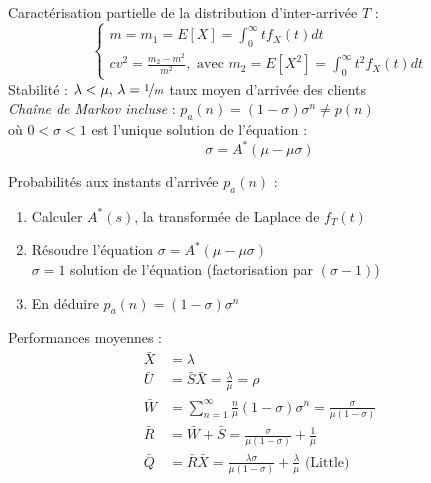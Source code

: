\documentclass[french]{scrartcl}
\begin{document}
\begin{multicols}{3}
\begin{fleqn}
{\begin{center}
\end{center}
Caractérisation partielle de la distribution d'inter-arrivée $T$ :
\[
\begin{cases}
m=m_{1}=E\left[X\right]=\int_{0}^{\infty}tf_{X}\left(t\right)dt\\
cv^{2}=\frac{m_{2}-m^{2}}{m^{2}},\textrm{ avec } m_{2}=E\left[X^{2}\right]=\int_{0}^{\infty}t^{2}f_{X}\left(t\right)dt
\end{cases}
\]
Stabilité : $\lambda<\mu,\,\lambda=\nicefrac{1}{m}$ taux moyen d'arrivée des clients\\
\emph{Chaîne de Markov incluse} : $p_a(n)=(1-\sigma)\sigma^n\neq p(n)$ \\
où $0<\sigma<1$ est l'unique solution de l'équation :
\[\sigma=A^*(\mu-\mu\sigma)\]

Probabilités aux instants d'arrivée $p_a(n)$ :
\begin{enumerate}[label=--]
	\item Calculer $A^*(s)$, la transformée de Laplace de $f_T(t)$
	\item Résoudre l'équation $\sigma=A^*(\mu-\mu\sigma)$\\
	$\sigma=1$ solution de l'équation (factorisation par $(\sigma-1)$)
	\item En déduire $p_a(n)=(1-\sigma)\sigma^n$
\end{enumerate}
\vspace{3pt}
Performances moyennes :
\begin{align*}
\bar{X} & =\lambda\\
\bar{U} & =\bar{S}\bar{X}=\frac{\lambda}{\mu}=\rho\\
\bar{W} & = \sum_{n=1}^\infty\frac{n}{\mu}(1-\sigma)\sigma^n=\frac{\sigma}{\mu(1-\sigma)}\\
\bar{R} & =\bar{W}+\bar{S}=\frac{\sigma}{\mu\left(1-\sigma\right)}+\frac{1}{\mu}\\
\bar{Q} & =\bar{R}\bar{X}=\frac{\lambda\sigma}{\mu\left(1-\sigma\right)}+\frac{\lambda}{\mu}\textrm{ (Little)}
\end{align*}
}
\end{fleqn}
\end{multicols}

\end{document}
